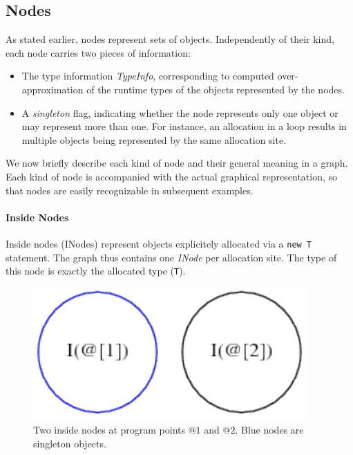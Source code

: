 \subsection{Nodes}
As stated earlier, nodes represent sets of objects. Independently of their
kind, each node carries two pieces of information:
\begin{itemize}
    \item The type information \textsl{TypeInfo}, corresponding to computed over-approximation of the runtime types
    of the objects represented by the nodes.
    \item A \emph{singleton} flag, indicating whether the node represents only
    one object or may represent more than one. For instance, an allocation in a
    loop results in multiple objects being represented by the same allocation site\cite{DBLP:conf/pldi/ChaseWZ90}.
\end{itemize}
We now briefly describe each kind of node and their general meaning in a
graph. Each kind of node is accompanied with the actual graphical
representation, so that nodes are easily recognizable in subsequent examples.

\paragraph{Inside Nodes}
Inside nodes (INodes) represent objects explicitely allocated via a \verb=new T=
statement. The graph thus contains one \emph{INode} per allocation site.
The type of this node is exactly the allocated type (\verb=T=).
\begin{figure}[h]
    \centering

    \includegraphics{images/pt_inodes}

    \caption{Two inside nodes at program points $@1$ and $@2$. Blue nodes are
    singleton objects.}
    \label{fig:pt:inodes}
\end{figure}

